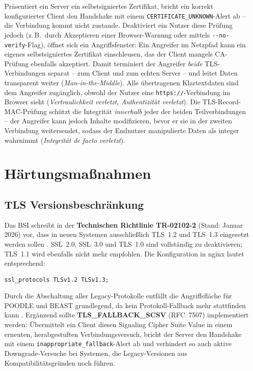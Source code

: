 Präsentiert ein Server ein selbstsigniertes Zertifikat, bricht ein korrekt konfigurierter Client den Handshake mit einem \texttt{CERTIFICATE\_UNKNOWN}-Alert ab -- die Verbindung kommt nicht zustande. Deaktiviert ein Nutzer diese Prüfung jedoch (z.\,B.\ durch Akzeptieren einer Browser-Warnung oder mittels \texttt{-{}-no-verify}-Flag), öffnet sich ein Angriffsfenster: Ein Angreifer im Netzpfad kann ein eigenes selbstsigniertes Zertifikat einschleusen, das der Client mangels CA-Prüfung ebenfalls akzeptiert. Damit terminiert der Angreifer \emph{beide} TLS-Verbindungen separat -- zum Client und zum echten Server -- und leitet Daten transparent weiter (\textit{Man-in-the-Middle}). Alle übertragenen Klartextdaten sind dem Angreifer zugänglich, obwohl der Nutzer eine \texttt{https://}-Verbindung im Browser sieht (\textit{Vertraulichkeit verletzt, Authentizität verletzt}). Die TLS-Record-MAC-Prüfung schützt die Integrität \emph{innerhalb} jeder der beiden Teilverbindungen -- der Angreifer kann jedoch Inhalte modifizieren, bevor er sie in der zweiten Verbindung weitersendet, sodass der Endnutzer manipulierte Daten als integer wahrnimmt (\textit{Integrität de facto verletzt}).

\section{Härtungsmaßnahmen}
\subsection*{TLS Versionsbeschränkung}

Das BSI schreibt in der \textbf{Technischen Richtlinie TR-02102-2} (Stand: Januar 2026) vor, dass in neuen Systemen ausschließlich TLS~1.2 und TLS~1.3 eingesetzt werden sollen \cite{bsi-tr02102}. SSL~2.0, SSL~3.0 und TLS~1.0 sind vollständig zu deaktivieren; TLS~1.1 wird ebenfalls nicht mehr empfohlen. Die Konfiguration in nginx lautet entsprechend:

\begin{lstlisting}
ssl_protocols TLSv1.2 TLSv1.3;
\end{lstlisting}

Durch die Abschaltung aller Legacy-Protokolle entfällt die Angriffsfläche für POODLE und BEAST \cite{cve-beast} grundlegend, da kein Protokoll-Fallback mehr stattfinden kann \cite{thomas-krenn-poodle}. Ergänzend sollte \textbf{TLS\_FALLBACK\_SCSV} (RFC~7507) implementiert werden: Übermittelt ein Client diesen Signaling Cipher Suite Value in einem erneuten, herabgestuften Verbindungsversuch, bricht der Server den Handshake mit einem \texttt{inappropriate\_fallback}-Alert ab und verhindert so auch aktive Downgrade-Versuche bei Systemen, die Legacy-Versionen aus Kompatibilitätsgründen noch führen.

